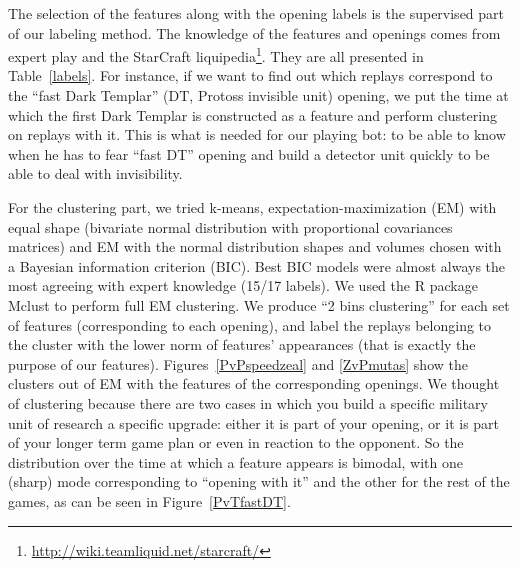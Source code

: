 The selection of the features along with the opening labels is the supervised part of our labeling method. The knowledge of the features and openings comes from expert play and the StarCraft liquipedia\footnote{\url{http://wiki.teamliquid.net/starcraft/}}. They are all presented in Table~\ref{labels}. For instance, if we want to find out which replays correspond to the ``fast Dark Templar'' (DT, Protoss invisible unit) opening, we put the time at which the first Dark Templar is constructed as a feature and perform clustering on replays with it. This is what is needed for our playing bot: to be able to know when he has to fear ``fast DT'' opening and build a detector unit quickly to be able to deal with invisibility.


For the clustering part, we tried k-means, expectation-maximization (EM) with equal shape (bivariate normal distribution with proportional covariances matrices) and EM with the normal distribution shapes and volumes chosen with a Bayesian information criterion (BIC). Best BIC models were almost always the most agreeing with expert knowledge (15/17 labels). We used the R package Mclust \citep{Mclust,Mclust2} to perform full EM clustering. We produce ``2 bins clustering'' for each set of features (corresponding to each opening), and label the replays belonging to the cluster with the lower norm of features' appearances (that is exactly the purpose of our features). Figures~\ref{PvPspeedzeal} %
and \ref{ZvPmutas} show the clusters out of EM with the features of the corresponding openings. We thought of clustering because there are two cases in which you build a specific military unit of research a specific upgrade: either it is part of your opening, or it is part of your longer term game plan or even in reaction to the opponent. So the distribution over the time at which a feature appears is bimodal, with one (sharp) mode corresponding to ``opening with it'' and the other for the rest of the games, as can be seen in Figure~\ref{PvTfastDT}.

